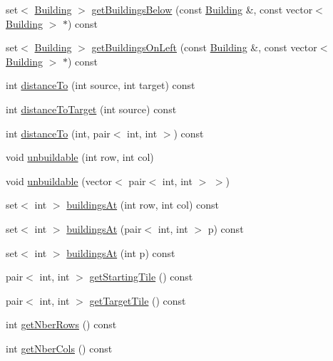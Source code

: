 \begin{DoxyCompactItemize}
\item 
set$<$ \hyperlink{classghost_1_1Building}{Building} $>$ \hyperlink{classghost_1_1WallinDomain_a2ed68f6e028dc9872d75d93de6bb5905}{get\-Buildings\-Below} (const \hyperlink{classghost_1_1Building}{Building} \&, const vector$<$ \hyperlink{classghost_1_1Building}{Building} $>$ $\ast$) const 
\item 
set$<$ \hyperlink{classghost_1_1Building}{Building} $>$ \hyperlink{classghost_1_1WallinDomain_a23673a2cee22736b835c7cbe81bae2c0}{get\-Buildings\-On\-Left} (const \hyperlink{classghost_1_1Building}{Building} \&, const vector$<$ \hyperlink{classghost_1_1Building}{Building} $>$ $\ast$) const 
\item 
int \hyperlink{classghost_1_1WallinDomain_a0c3fad190a8451f2d9b254092e909ce7}{distance\-To} (int source, int target) const 
\item 
int \hyperlink{classghost_1_1WallinDomain_a110392fdc31ebff961ffef5931640e2c}{distance\-To\-Target} (int source) const 
\item 
int \hyperlink{classghost_1_1WallinDomain_aec732a13619c872380237e3b0de560a0}{distance\-To} (int, pair$<$ int, int $>$) const 
\item 
void \hyperlink{classghost_1_1WallinDomain_a7439a8cf1148b6ad451f4f23d92765e1}{unbuildable} (int row, int col)
\item 
void \hyperlink{classghost_1_1WallinDomain_ac29b7395041e907eb1b94527ac6ebf36}{unbuildable} (vector$<$ pair$<$ int, int $>$ $>$)
\item 
set$<$ int $>$ \hyperlink{classghost_1_1WallinDomain_a98b384df437bc0e42dba65ca9fc50538}{buildings\-At} (int row, int col) const 
\item 
set$<$ int $>$ \hyperlink{classghost_1_1WallinDomain_a212b9349b853c945db66506c5be32453}{buildings\-At} (pair$<$ int, int $>$ p) const 
\item 
set$<$ int $>$ \hyperlink{classghost_1_1WallinDomain_a4fb018a9cb3060e50fe365373b2b4e2d}{buildings\-At} (int p) const 
\item 
pair$<$ int, int $>$ \hyperlink{classghost_1_1WallinDomain_a7153bae0bb61766fb5f8d8513c96ed08}{get\-Starting\-Tile} () const 
\item 
pair$<$ int, int $>$ \hyperlink{classghost_1_1WallinDomain_a560a286cdec9228bb1087acad7666308}{get\-Target\-Tile} () const 
\item 
int \hyperlink{classghost_1_1WallinDomain_a857f98df5301e17b563dff7b16b16b75}{get\-Nber\-Rows} () const 
\item 
int \hyperlink{classghost_1_1WallinDomain_a2e7a3e6eed0a98243349b8e2438769bd}{get\-Nber\-Cols} () const 

\end{DoxyCompactItemize}
